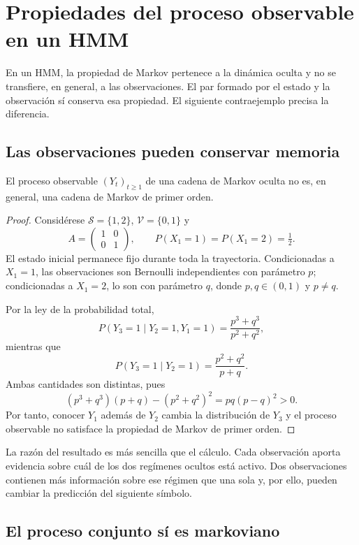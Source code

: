 \chapter{Propiedades del proceso observable en un HMM}
\label{app:hmm-observable}

En un HMM, la propiedad de Markov pertenece a la dinámica oculta y no se transfiere, en general, a las observaciones. El par formado por el estado y la observación sí conserva esa propiedad. El siguiente contraejemplo precisa la diferencia.

\section{Las observaciones pueden conservar memoria}

\begin{proposition}
El proceso observable $(Y_t)_{t\geq 1}$ de una cadena de Markov oculta no es, en general, una cadena de Markov de primer orden.
\end{proposition}

\begin{proof}
Considérese $\mathcal{S}=\{1,2\}$, $\mathcal{V}=\{0,1\}$ y
\[
A=
\begin{pmatrix}
1&0\\
0&1
\end{pmatrix},
\qquad
P(X_1=1)=P(X_1=2)=\tfrac12.
\]
El estado inicial permanece fijo durante toda la trayectoria. Condicionadas a $X_1=1$, las observaciones son Bernoulli independientes con parámetro $p$; condicionadas a $X_1=2$, lo son con parámetro $q$, donde $p,q\in(0,1)$ y $p\neq q$.

Por la ley de la probabilidad total,
\[
P(Y_3=1\mid Y_2=1,Y_1=1)
=
\frac{p^3+q^3}{p^2+q^2},
\]
mientras que
\[
P(Y_3=1\mid Y_2=1)
=
\frac{p^2+q^2}{p+q}.
\]
Ambas cantidades son distintas, pues
\[
(p^3+q^3)(p+q)-(p^2+q^2)^2
=
pq(p-q)^2>0.
\]
Por tanto, conocer $Y_1$ además de $Y_2$ cambia la distribución de $Y_3$ y el proceso observable no satisface la propiedad de Markov de primer orden.
\end{proof}

La razón del resultado es más sencilla que el cálculo. Cada observación aporta evidencia sobre cuál de los dos regímenes ocultos está activo. Dos observaciones contienen más información sobre ese régimen que una sola y, por ello, pueden cambiar la predicción del siguiente símbolo.

\section{El proceso conjunto sí es markoviano}

